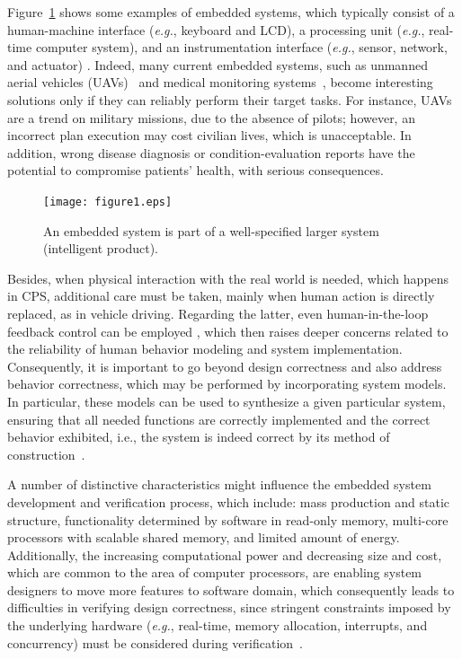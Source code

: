 \documentclass{acm_sen_article}
\begin{document}
Figure~\ref{intelligent-product} shows some examples of embedded systems, which typically consist of a human-machine interface ({\it e.g.}, keyboard and LCD), a processing unit ({\it e.g.}, real-time computer system), and an instrumentation interface ({\it e.g.}, sensor, network, and actuator) \cite{Kopetz11}. Indeed, many current embedded systems, such as unmanned aerial vehicles (UAVs)~\cite{groza2015formal} and medical monitoring systems~\cite{Cordeiro09}, become interesting solutions only if they can reliably perform their target tasks. For instance, UAVs are a trend on military missions, due to the absence of pilots; however, an incorrect plan execution may cost civilian lives, which is unacceptable. In addition, wrong disease diagnosis or condition-evaluation reports have the potential to compromise patients' health, with serious consequences.
%
\begin{figure}[!t]
	\centering
	\texttt{[image: figure1.eps]}
	\caption{An embedded system is part of a well-specified larger system (intelligent product).}
	\label{intelligent-product}
\end{figure}

Besides, when physical interaction with the real world is needed, which happens in CPS, additional care must be taken, mainly when human action is directly replaced, as in vehicle driving. Regarding the latter, even human-in-the-loop feedback control can be employed \cite{munir}, which then raises deeper concerns related to the reliability of human behavior modeling and system implementation. Consequently, it is important to go beyond design correctness and also address behavior correctness, which may be performed by incorporating system models. In particular, these models can be used to synthesize a given particular system, ensuring that all needed functions are correctly implemented and the correct behavior exhibited, {i.e.}, the system is indeed correct by its method of construction~\cite{Abate17}.

A number of distinctive characteristics might influence the embedded system development and verification process, which include: mass production and static structure, functionality determined by software in read-only memory, multi-core processors with scalable shared memory, and limited amount of energy. Additionally, the increasing computational power and decreasing size and cost, which are common to the area of computer processors, are enabling system designers to move more features to software domain, which consequently leads to difficulties in verifying design correctness, since stringent constraints imposed by the underlying hardware ({\it e.g.}, real-time, memory allocation, interrupts, and concurrency) must be considered during verification~\cite{Kroening15}.
\end{document}
